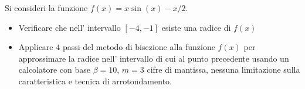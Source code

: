 Si consideri la funzione $f(x)=x \sin(x)-x/2$.
\begin{itemize}
\item Verificare che nell' intervallo $[-4, -1]$ esiste una radice di $f(x)$
\item Applicare $4$ passi del metodo di bisezione alla funzione $f(x)$ per approssimare la radice nell' intervallo di cui al punto precedente
usando un calcolatore con base $\beta =10$, $m=3$ cifre di
mantissa, nessuna limitazione sulla caratteristica e tecnica di
arrotondamento. 
\end{itemize}
